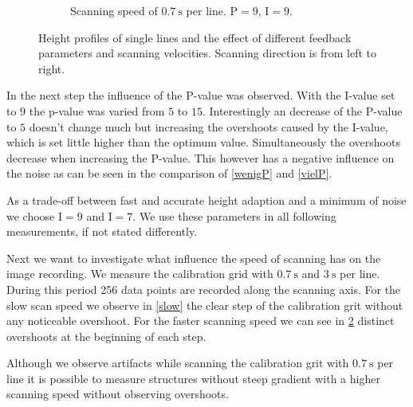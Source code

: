 \documentclass[paper=a4,fontsize=10pt,DIV=18,twocolumn,parskip=half]{scrartcl}
\numberwithin{equation}{section}    %
\begin{document}
\begin{figure}
\begin{subfigure}{0.45\columnwidth}
        \caption{Scanning speed of 
        $\SI{0.7}{\second}$ per line. $\mathrm{P}=9$, $\mathrm{I}=9$.}
        \label{fast}
    \end{subfigure}
    \caption{Height profiles of single lines and the effect of different 
    feedback parameters and scanning velocities. Scanning direction is from left 
    to right.}
\end{figure}

In the next step the influence of the P-value was observed. With the I-value set 
to $9$ the p-value was varied from $5$ to $15$. Interestingly an decrease of the 
P-value to $5$ doesn't change much but increasing the overshoots caused by the 
I-value, which is set little higher than the optimum value. Simultaneously the 
overshoots decrease when increasing the P-value. This however has a negative 
influence on the noise as can be seen in the comparison of \ref{wenigP} and 
\ref{vielP}.

As a trade-off between fast and accurate height adaption and a minimum of noise 
we choose $\mathrm{I}=9$ and $\mathrm{I}=7$. We use these parameters in all 
following measurements, if not stated differently.

Next we want to investigate what influence the speed of scanning has on the 
image recording. We measure the calibration grid with $\SI{0.7}{\second}$ and 
$\SI{3}{\second}$ per line. During this period 256 data points are recorded 
along the scanning axis.  For the slow scan speed we observe in \ref{slow} the 
clear step of the calibration grit without any noticeable overshoot. For the 
faster scanning speed we can see in \ref{fast} distinct overshoots at the 
beginning of each step.

Although we observe artifacts while scanning the calibration grit with  
$\SI{0.7}{\second}$ per line it is possible to measure structures without steep 
gradient with a higher scanning speed without observing overshoots.
\end{document}
